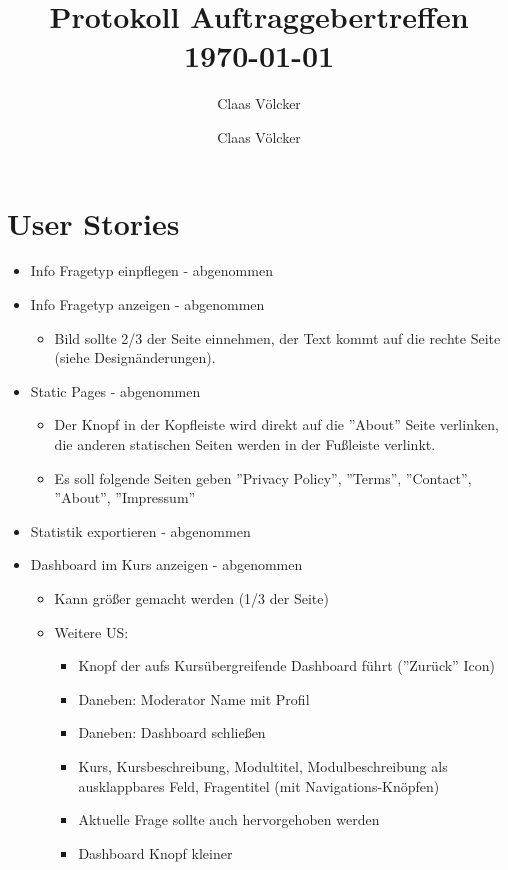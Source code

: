 \documentclass[colorback, accentcolor=tud1c, paper=a4]{tudexercise}
\title{Protokoll Auftraggebertreffen \today}
\subtitle{Claas Völcker}
\author{Claas Völcker}
\begin{document}
\maketitle

\section*{User Stories}
\begin{multicols}{2}
\begin{itemize}
	\item Info Fragetyp einpflegen - abgenommen
	\item Info Fragetyp anzeigen - abgenommen
	\begin{itemize}
		\item Bild sollte 2/3 der Seite einnehmen, der Text kommt auf die rechte Seite (siehe Designänderungen). 
	\end{itemize}
	\item Static Pages - abgenommen
	\begin{itemize}
		\item Der Knopf in der Kopfleiste wird direkt auf die ''About'' Seite verlinken, die anderen statischen Seiten werden in der Fußleiste verlinkt.
		\item Es soll folgende Seiten geben ''Privacy Policy'', ''Terms'', ''Contact'', ''About'', ''Impressum''
	\end{itemize}
	\item Statistik exportieren - abgenommen
	\item Dashboard im Kurs anzeigen - abgenommen
	\begin{itemize}
		\item Kann größer gemacht werden (1/3 der Seite)
		\item Weitere US:
		\begin{itemize}
			\item Knopf der aufs Kursübergreifende Dashboard führt (''Zurück'' Icon)
			\item Daneben: Moderator Name mit Profil
			\item Daneben: Dashboard schließen
			\item Kurs, Kursbeschreibung, Modultitel, Modulbeschreibung als ausklappbares Feld, Fragentitel (mit Navigations-Knöpfen)
			\item Aktuelle Frage sollte auch hervorgehoben werden
			\item Dashboard Knopf kleiner
		\end{itemize}
	\end{itemize}

\end{itemize}
\end{multicols}
\end{document}
